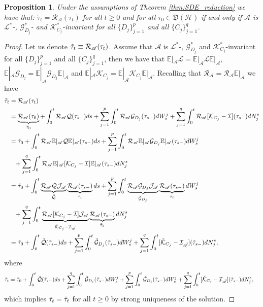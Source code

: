 \documentclass[aihp,12pt]{imsart}
\newcommand{\Gc}{\mathcal{G}}
\newcommand{\Hc}{\mathcal{H}}
\newcommand{\Jc}{\mathcal{J}}
\newcommand{\Rc}{\mathcal{R}}
\newcommand{\Qc}{\mathcal{Q}}
\newcommand{\Ic}{\mathcal{I}}
\newcommand{\Kc}{\mathcal{K}}
\newcommand{\Lc}{\mathcal{L}}
\newcommand{\As}{\mathscr{A}}
\newcommand{\Df}{\mathfrak{D}}
\newcommand{\CE}{\mathbb{E}|}
\theoremstyle{theorem}
\newtheorem{proposition}{Proposition}
\theoremstyle{definition}
\theoremstyle{remark}
\begin{document}
\begin{proposition}
\label{thm:invariant_algebra}
    Under the assumptions of Theorem \ref{thm:SDE_reduction} we have that: $\check{\tau}_t = \Rc_\As(\tau_t)$ for all $t\geq0$ and for all $\tau_0\in\Df(\Hc)$ if and only if $\As$ is  $\Lc^*$-, $\Gc_{D_j}^*$- and $\Kc_{C_j}^*$-invariant for all $\{D_j\}_{j=1}^p$ and all $\{C_j\}_{j=1}^q$. 
\end{proposition}
\begin{proof}
    Let us denote $\Tilde{\tau}_t \equiv \Rc_\As(\tau_t)$. Assume that $\As$ is $\Lc^*$-, $\Gc_{D_j}^*$ and $\Kc_{C_j}^*$-invariant for all $\{D_j\}_{j=1}^p$ and all $\{C_j\}_{j=1}^q$, then we have that $\CE_{\As}  \Lc  = \CE_{\As}  \Lc  \CE_{\As}$, $\CE_{\As} \Gc_{D_j} = \CE_{\As}\Gc_{D_j}\CE_{\As}$ and $\CE_{\As} \Kc_{C_j} = \CE_{\As}\Kc_{C_j}\CE_{\As}$. Recalling that $\Rc_\As = \Rc_\As\CE_\As$ we have 
    \begin{align*}
        \Tilde{\tau}_t&=\Rc_\As(\tau_t) \\&= \underbrace{\Rc_\As(\tau_0)}_{\check{\tau}_0} + \int_0^t \Rc_\As\Qc(\tau_{s-}) ds + \sum_{j=1}^p \int_0^t \Rc_\As\Gc_{D_j}(\tau_{s-}) dW_s^j + \sum_{j=1}^q\int_0^t \Rc_\As [\Kc_{C_j}-\Ic](\tau_{s-}) dN_j^s\\
        &= \check{\tau}_0 + \int_0^t \Rc_\As\CE_\As\Qc\CE_\As(\tau_{s-}) ds + \sum_{j=1}^p \int_0^t \Rc_\As\CE_\As\Gc_{D_j}\CE_\As(\tau_{s-}) dW_s^j \\&\hphantom{=}+ \sum_{j=1}^q\int_0^t \Rc_\As \CE_\As [\Kc_{C_j}-\Ic]\CE_\As(\tau_{s-}) dN_j^s\\
        &= \check{\tau}_0 + \int_0^t \underbrace{\Rc_\As\Qc \Jc_\As}_{\check{\Qc}}\underbrace{\Rc_\As(\tau_{s-})}_{\Tilde{\tau}_t} ds + \sum_{j=1}^p \int_0^t \underbrace{\Rc_\As \Gc_{D_j} \Jc_\As}_{\check{\Gc}_{D_j}}\underbrace{\Rc_\As (\tau_{s-})}_{\Tilde{\tau}_t} dW_s^j \\&\hphantom{=}+ \sum_{j=1}^q\int_0^t \underbrace{\Rc_\As [\Kc_{C_j}-\Ic]\Jc_\As}_{\check{\Kc}_{C_j}-\Ic_{\check{\As}}}\underbrace{\Rc_\As(\tau_{s-})}_{\Tilde{\tau}_s} dN_j^s\\
        &= \check{\tau}_0 + \int_0^t {\check{\Qc}}({\Tilde{\tau}_{s-}}) ds + \sum_{j=1}^p \int_0^t {\check{\Gc}_{D_j}}({\Tilde{\tau}_{s-}}) dW_s^j + \sum_{j=1}^q\int_0^t [{\check{\Kc}_{C_j}-\Ic_{\check{\As}}}]({\Tilde{\tau}_{s-}}) dN_j^s,
    \end{align*}
    where 
    \begin{align*}
        \check{\tau}_t &= \check{\tau}_0 + \int_0^t {\check{\Qc}}(\check{\tau}_{s-}) ds + \sum_{j=1}^q \int_0^t {\check{\Gc}_{D_j}}(\check{\tau}_{s-}) dW_s^j + \sum_{j=1}^p \int_0^t {\check{\Gc}_{D_j}}({\Tilde{\tau}_{s-}}) dW_s^j + \sum_{j=1}^q\int_0^t [{\check{\Kc}_{C_j}}-\Ic_{\check{\As}}]({\check{\tau}_{s-}}) dN_j^s,
    \end{align*}
    which implies $\Tilde{\tau}_t = \check{\tau}_t$ for all $t\geq0$ by strong uniqueness of the solution.


\end{proof}
\end{document}
